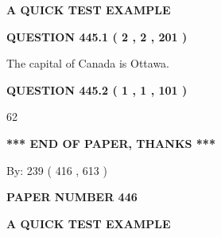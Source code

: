 \documentclass[12pt]{article}
\begin{document}
   
 \vspace{0.2in}
{\LARGE {\textbf{ A QUICK TEST EXAMPLE}}}
   
   
  
\vspace{0.2in}
  
{\textbf{\Large{QUESTION
445.1 
 ( 2 , 2 , 201 )
}}}
  
  
 
 
\noindent{}
 
 
The capital of Canada is Ottawa.
 
 
 
 
  
\vspace{0.2in}
  
{\textbf{\Large{QUESTION
445.2 
 ( 1 , 1 , 101 )
}}}
  
  
 
 
\noindent{}

62
 
 
   
   
 \vspace{0.2in}
 
   
   
   
   
\vspace{1.0in} 
{\textbf{\large{ *** END OF PAPER, THANKS *** }}} 
   
   
\hspace{1.0in} By: 
 239 ( 416 ,  613 )
   
   
   
   
\newpage 
\setcounter{page}{ 
   446001 } 
   
   
   
   
 {\textbf{ \Large{ PAPER NUMBER  446  }}}
   
   
\vspace{0.2in}
   
   
   
   
   
   
 \vspace{0.2in}
{\LARGE {\textbf{ A QUICK TEST EXAMPLE}}}
   
   
  
\vspace{0.2in}
  
\end{document}
